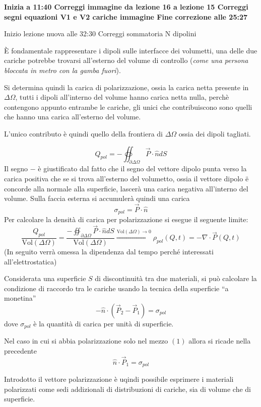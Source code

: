 \textbf{Inizia a 11:40
Correggi immagine da lezione 16 a lezione 15
Correggi segni equazioni V1 e V2 cariche immagine
Fine correzione alle 25:27}

Inizio lezione nuova alle 32:30
Correggi sommatoria N dipolini

È fondamentale rappresentare i dipoli sulle interfacce
dei volumetti, una delle due cariche potrebbe trovarsi
all'esterno del volume di controllo (\textit{come una persona 
bloccata in metro con la gamba fuori}).

Si determina quindi la carica di polarizzazione, ossia la 
carica netta presente in $\Delta\Omega$, tutti i dipoli
all'interno del volume hanno carica netta nulla, perchè 
contengono appunto entrambe le cariche, gli unici che 
contribuiscono sono quelli che hanno una carica all'esterno 
del volume.

L'unico contributo è quindi quello della frontiera di
$\Delta\Omega$ ossia dei dipoli tagliati.

$$
Q_{pol} = -\oiint_{\partial\Delta\Omega} \vec{P}\cdot\hat{n}dS
$$
Il segno $-$ è giustificato dal fatto che il segno del vettore
dipolo punta verso la carica positiva che se si trova all'esterno
del volumetto, ossia il vettore dipolo ë concorde alla normale
alla superficie, lascerà una carica negativa all'interno del 
volume.
Sulla faccia esterna si accumulerà quindi una carica 
$$
\sigma_{pol} = \vec{P}\cdot\hat{n}
$$
Per calcolare la densità di carica per polarizzazione si esegue il 
seguente limite:
$$
\frac{Q_{pol}}{\text{Vol}(\Delta\Omega)} = 
\frac{-\oiint_{\partial\Delta\Omega} \vec{P}\cdot\hat{n}dS}
{\text{Vol}(\Delta\Omega)} \stackrel{\text{Vol}(\Delta\Omega)\to 0}{\Rightarrow} \rho_{pol}(Q,t) = -\nabla\cdot\vec{P}(Q,t)
$$
(In seguito verrà omessa la dipendenza dal tempo perché interessati 
all'elettrostatica)

Considerata una superficie $S$ di discontinuità tra due materiali,
si può calcolare la condizione di raccordo tra le cariche usando 
la tecnica della superficie ``a monetina''
$$
-\hat{n}\cdot(\vec{P}_2-\vec{P}_1) = \sigma_{pol}
$$
dove $\sigma_{pol}$ è la quantità di carica per unità di superficie.

Nel caso in cui si abbia polarizzazione solo nel mezzo $(1)$
allora si ricade nella precedente
$$
\hat{n}\cdot\vec{P}_1 = \sigma_{pol}
$$

Introdotto il vettore polarizzazione è uqindi possibile esprimere
i materiali polarizzati come sedi addizionali di distribuzioni di 
cariche, sia di volume che di superficie.

